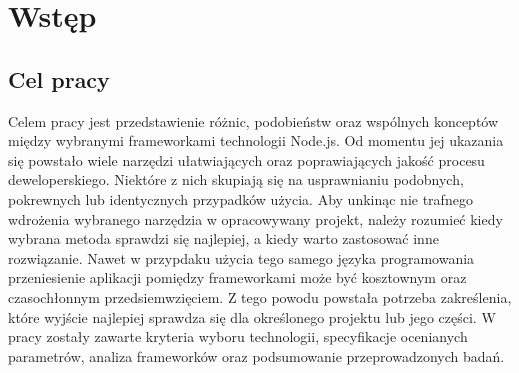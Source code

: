 \documentclass[12pt]{report}
\begin{document}
\tableofcontents
\chapter{Wstęp}
  \section{Cel pracy}
    Celem pracy jest przedstawienie różnic, podobieństw oraz wspólnych konceptów między wybranymi frameworkami technologii Node.js.
    Od momentu jej ukazania się powstało wiele narzędzi ułatwiających oraz poprawiających jakość procesu deweloperskiego.
    Niektóre z nich skupiają się na usprawnianiu podobnych, pokrewnych lub identycznych przypadków użycia.
    Aby unkinąc nie trafnego wdrożenia wybranego narzędzia w opracowywany projekt, należy rozumieć kiedy wybrana metoda sprawdzi się najlepiej, a kiedy warto zastosować inne rozwiązanie.
    Nawet w przypdaku użycia tego samego języka programowania przeniesienie aplikacji pomiędzy frameworkami może być kosztownym oraz czasochłonnym przedsiemwzięciem.
    Z tego powodu powstała potrzeba zakreślenia, które wyjście najlepiej sprawdza się dla określonego projektu lub jego części.
    W pracy zostały zawarte kryteria wyboru technologii, specyfikacje ocenianych parametrów, analiza frameworków oraz podsumowanie przeprowadzonych badań.
\end{document}
